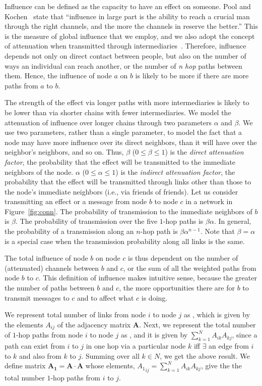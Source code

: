 \documentclass{sig-alternate}
\newcommand{\figref}[1]{Figure~\ref{#1}}
\begin{document}
Influence can be defined as the capacity to have an effect on someone. Pool and Kochen~\cite{Pool}  state that  ``influence in large part is the ability to reach a crucial man through the right channels, and the more the channels in reserve the better.'' This is the measure of global influence that we employ, and we also adopt the concept of attenuation when transmitted  through intermediaries~\cite{Katz}. Therefore, influence depends not only on direct contact between people, but also on the number of ways an individual can reach another, or the number of \emph{n hop} paths between them. Hence, the influence of node $a$ on $b$ is likely to be more if there are more paths from $a$ to $b$.

The strength of the effect  via longer paths with more intermediaries is likely to be lower than via shorter chains with fewer intermediaries. We model the attenuation of influence over longer chains through two parameters $ \alpha $   and $\beta$. We use two parameters, rather than a single parameter, to model the fact that a node may have more influence over its direct neighbors, than it will have over the neighbor's neighbors, and so on. Thus, $\beta $ ($ 0 \le \beta \le 1$) is the \emph{direct attenuation factor},  the probability that the effect will be transmitted to the immediate neighbors of the node.  $\alpha$ ($ 0 \le \alpha \le 1$) is the \emph{indirect attenuation factor}, the probability that the effect will be transmitted through links other than those to the node's immediate neighbors (i.e., via friends of friends). Let us consider transmitting an effect or a message from node $b$  to node $c$ in a network in \figref{fig:conn}. The probability of transmission to the immediate neighbors of $b$ is $\beta$. The probability of transmission over the five $1$-hop paths is $\beta \alpha$. In general, the probability of a transmission along an $n$-hop path is $\beta \alpha^{n-1}$. Note that $\beta =\alpha$ is a special case when the transmission probability along all links is the same.

The total influence of node $b$ on node $c$ is thus dependent on the number of (attenuated) channels between $b$ and $c$, or  the sum of all the  weighted paths from  node $b$ to $c$. This definition of influence makes intuitive sense, because the greater the number of paths between $b$ and $c$, the more opportunities there are for $b$ to transmit messages to $c$ and to affect what $c$ is doing.


We represent total number of links from node $i$ to node $j$ as , which is given by the elements $ A_{ij}$ of the adjacency matrix $\mathbf{A}$.
Next, we represent the total number of $1$-hop paths from node $i$ to node $j$ as  , and it is given by $\sum_{k=1}^{N} A_{ik} A_{kj} $, since a path can exist from $i$ to $j$  in one hop via a particular node $k$ iff $\exists$ an edge from  $i$ to $k$ and also from $k$ to $j$. Summing over all $k \in N$, we get the above result. We define matrix $\mathbf{A_1 =A \cdot A}$ whose elements, ${A_1}_{ij}= \sum_{k=1}^{N} A_{ik} A_{kj}$, give the the total number $1$-hop paths from $i$ to $j$.
\end{document}
